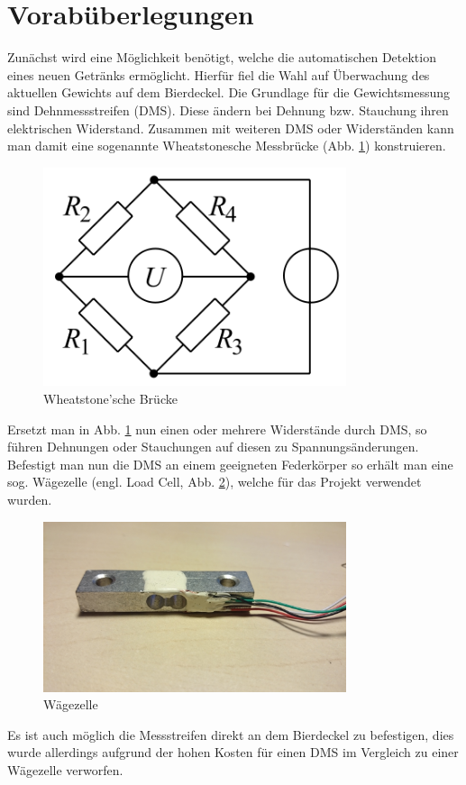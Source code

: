 \documentclass[12pt,journal]{IEEEtran}
\begin{document}
\section{Vorabüberlegungen}
Zunächst wird eine Möglichkeit benötigt, welche die automatischen Detektion eines neuen Getränks ermöglicht.
Hierfür fiel die Wahl auf Überwachung des aktuellen Gewichts auf dem Bierdeckel.
Die Grundlage für die Gewichtsmessung sind Dehnmessstreifen (DMS).
Diese ändern bei Dehnung bzw. Stauchung ihren elektrischen Widerstand.
Zusammen mit weiteren DMS oder Widerständen kann man damit eine sogenannte Wheatstonesche Messbrücke (Abb. \ref{fig_wheatstone}) konstruieren.
\begin{figure}[!h]
  \centering
    \includegraphics[width=3.5in]{images/wheatstone.png}
    \caption{Wheatstone'sche Brücke}
  \label{fig_wheatstone}
\end{figure}
Ersetzt man in Abb. \ref{fig_wheatstone} nun einen oder mehrere Widerstände durch DMS, so führen Dehnungen oder Stauchungen auf diesen zu Spannungsänderungen.
Befestigt man nun die DMS an einem geeigneten Federkörper so erhält man eine sog. Wägezelle (engl. Load Cell, Abb. \ref{fig_loadcell}), welche für das Projekt verwendet wurden.
\begin{figure}[!h]
  \centering
    \includegraphics[width=3.5in]{images/loadcell.jpg}
    \caption{Wägezelle}
  \label{fig_loadcell}
\end{figure}
Es ist auch möglich die Messstreifen direkt an dem Bierdeckel zu befestigen, dies wurde allerdings aufgrund der hohen Kosten für einen DMS im Vergleich zu einer Wägezelle verworfen.
\end{document}
